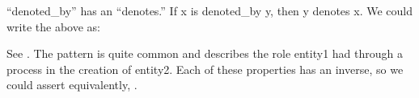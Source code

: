 \documentclass[letterpaper,10pt,english]{sphinxmanual}
\begin{document}
\sphinxAtStartPar
“denoted\_by” has an  “denotes.”  If x is denoted\_by y, then y denotes x.
We could write the above as:

\begin{sphinxVerbatim}[commandchars=\\\{\}]
  
  
  
\end{sphinxVerbatim}

\sphinxAtStartPar
See {\hyperref[\detokenize{locations:table-14}]{}}. The pattern  is quite common and describes the role entity1 had through a process
in
the creation of entity2. Each of these properties has an inverse, so we could assert
equivalently, .
\end{document}
